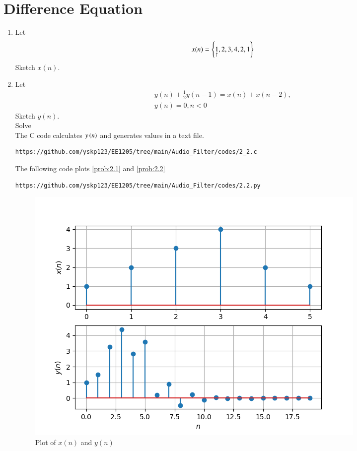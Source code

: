 \documentclass[journal,12pt,twocolumn]{IEEEtran}
\theoremstyle{remark}
\begin{document}
\section{Difference Equation}
\begin{enumerate}[label=\thesection.\arabic*,ref=\thesection.\theenumi]
\item Let
\begin{equation}
x(n) = \left\{\underset{\uparrow}{1},2,3,4,2,1\right\} \label{prob:2.1}
\end{equation}
Sketch $x(n)$. 
\item Let
\begin{multline}
y(n) + \frac{1}{2}y(n-1) = x(n) + x(n-2), 
\\
y(n) = 0, n < 0 \label{prob:2.2}
\end{multline}
Sketch $y(n)$.\\
Solve\\
\solution  The C code calculates $y\left(n\right)$ and generates values in a text file.
\begin{lstlisting}
https://github.com/yskp123/EE1205/tree/main/Audio_Filter/codes/2_2.c
\end{lstlisting} 
The following code plots \eqref{prob:2.1} and \eqref{prob:2.2}
\begin{lstlisting}
https://github.com/yskp123/EE1205/tree/main/Audio_Filter/codes/2.2.py
\end{lstlisting}

\begin{figure}[H]
	\centering
	\includegraphics[width=\columnwidth]{figs/Plot_xn_yn.png}
	\caption{Plot of $x(n)$ and $y(n)$}
	\label{fig:xnyn}
\end{figure}
\end{enumerate}
\end{document}
